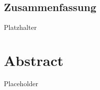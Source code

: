 \begin{otherlanguage}{ngerman}
	\chapter*{Zusammenfassung}

	Platzhalter
\end{otherlanguage}



{\let\clearpage\relax\chapter*{Abstract}\label{ch:abstract}}

Placeholder
